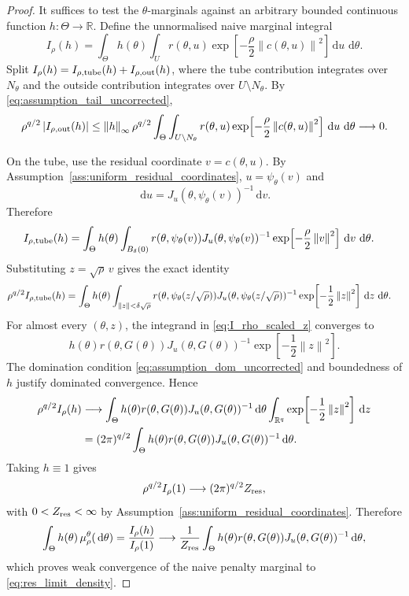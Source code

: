 \documentclass[11pt]{article}
\newcommand{\R}{\mathbb{R}}
\newcommand{\dd}{\,\mathrm{d}}
\newcommand{\abs}[1]{\left\lvert #1\right\rvert}
\newcommand{\norm}[1]{\left\lVert #1\right\rVert}
\begin{document}
\begin{proof}
It suffices to test the \(\theta\)-marginals against an arbitrary bounded
continuous function \(h:\Theta\to\R\). Define the unnormalised naive marginal
integral
\begin{equation}
 I_\rho(h)
 =
 \int_\Theta h(\theta)
 \int_U
 r(\theta,u)
 \exp\!\left[-\frac{\rho}{2}\norm{c(\theta,u)}^2\right]
 \dd u\,\dd\theta .
 \label{eq:I_rho_h_revised}
\end{equation}
Split \(I_\rho(h)=I_{\rho,{\rm tube}}(h)+I_{\rho,{\rm out}}(h)\), where the tube contribution integrates over \(N_\theta\) and the outside contribution integrates over \(U\setminus N_\theta\). By
\eqref{eq:assumption_tail_uncorrected},
\[
 \rho^{q/2}\abs{I_{\rho,{\rm out}}(h)}
 \le
 \norm{h}_\infty
 \rho^{q/2}
 \int_\Theta\int_{U\setminus N_\theta}
 r(\theta,u)
 \exp\!\left[-\frac{\rho}{2}\norm{c(\theta,u)}^2\right]
 \dd u\,\dd\theta
 \longrightarrow 0 .
\]

On the tube, use the residual coordinate \(v=c(\theta,u)\). By Assumption~\ref{ass:uniform_residual_coordinates}, \(u=\psi_\theta(v)\) and
\[
 \dd u
 =
 J_u(\theta,\psi_\theta(v))^{-1}\dd v .
\]
Therefore
\begin{align}
 I_{\rho,{\rm tube}}(h)
 &=
 \int_\Theta h(\theta)
 \int_{B_\delta(0)}
 r(\theta,\psi_\theta(v))
 J_u(\theta,\psi_\theta(v))^{-1}
 \exp\!\left[-\frac{\rho}{2}\norm{v}^2\right]
 \dd v\,\dd\theta .
 \label{eq:I_rho_tube_v}
\end{align}
Substituting \(z=\sqrt{\rho}\,v\) gives the exact identity
\begin{align}
 \rho^{q/2}I_{\rho,{\rm tube}}(h)
 &=
 \int_\Theta h(\theta)
 \int_{\norm{z}<\delta\sqrt{\rho}}
 r(\theta,\psi_\theta(z/\sqrt{\rho}))
 J_u(\theta,\psi_\theta(z/\sqrt{\rho}))^{-1}
 \exp\!\left[-\frac{1}{2}\norm{z}^2\right]
 \dd z\,\dd\theta .
 \label{eq:I_rho_scaled_z}
\end{align}
For almost every \((\theta,z)\), the integrand in
\eqref{eq:I_rho_scaled_z} converges to
\[
 h(\theta)
 r(\theta,G(\theta))
 J_u(\theta,G(\theta))^{-1}
 \exp\!\left[-\frac{1}{2}\norm{z}^2\right].
\]
The domination condition \eqref{eq:assumption_dom_uncorrected} and boundedness of \(h\) justify dominated convergence. Hence
\begin{align}
 \rho^{q/2}I_\rho(h)
 &\longrightarrow
 \int_\Theta h(\theta)
 r(\theta,G(\theta))
 J_u(\theta,G(\theta))^{-1}
 \dd\theta
 \int_{\R^q}
 \exp\!\left[-\frac{1}{2}\norm{z}^2\right]\dd z \notag\\
 &=
 (2\pi)^{q/2}
 \int_\Theta h(\theta)
 r(\theta,G(\theta))
 J_u(\theta,G(\theta))^{-1}
 \dd\theta .
 \label{eq:I_rho_limit_revised}
\end{align}
Taking \(h\equiv1\) gives
\[
 \rho^{q/2}I_\rho(1)
 \longrightarrow
 (2\pi)^{q/2}Z_{\rm res},
\]
with \(0<Z_{\rm res}<\infty\) by Assumption~\ref{ass:uniform_residual_coordinates}. Therefore
\[
 \int_\Theta h(\theta)\,\mu_\rho^\theta(\dd\theta)
 =
 \frac{I_\rho(h)}{I_\rho(1)}
 \longrightarrow
 \frac{1}{Z_{\rm res}}
 \int_\Theta h(\theta)
 r(\theta,G(\theta))
 J_u(\theta,G(\theta))^{-1}
 \dd\theta ,
\]
which proves weak convergence of the naive penalty marginal to
\eqref{eq:res_limit_density}.


\end{proof}
\end{document}
